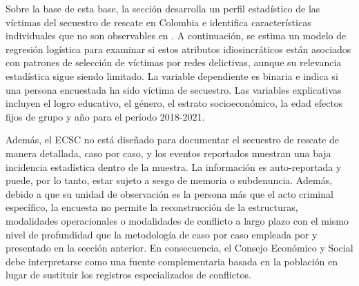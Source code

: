 \documentclass[12pt]{article}
\providecommand{\textcite}{\citet}
\theoremstyle{definition}
\theoremstyle{remark}
\newcommand{\1}{\mathbf{1}}
\begin{document}
Sobre la base de esta base, la sección desarrolla un perfil estadístico de las víctimas del secuestro de rescate en Colombia e identifica características individuales que no son observables en \textcite{cnmh_datos}. A continuación, se estima un modelo de regresión logística para examinar si estos atributos idiosincráticos están asociados con patrones de selección de víctimas por redes delictivas, aunque su relevancia estadística sigue siendo limitado. La variable dependiente es binaria e indica si una persona encuestada ha sido víctima de secuestro. Las variables explicativas incluyen el logro educativo, el género, el estrato socioeconómico, la edad efectos fijos de grupo y año para el período 2018-2021.

Además, el ECSC no está diseñado para documentar el secuestro de rescate de manera detallada, caso por caso, y los eventos reportados muestran una baja incidencia estadística dentro de la muestra. La información es auto-reportada y puede, por lo tanto, estar sujeto a sesgo de memoria o subdenuncia. Además, debido a que su unidad de observación es la persona más que el acto criminal específico, la encuesta no permite la reconstrucción de la estructuras, modalidades operacionales o modalidades de conflicto a largo plazo con el mismo nivel de profundidad que la metodología de caso por caso empleada por \textcite{cnmh_datos} y presentado en la sección anterior. En consecuencia, el Consejo Económico y Social debe interpretarse como una fuente complementaria basada en la población en lugar de sustituir los registros especializados de conflictos.
\end{document}
